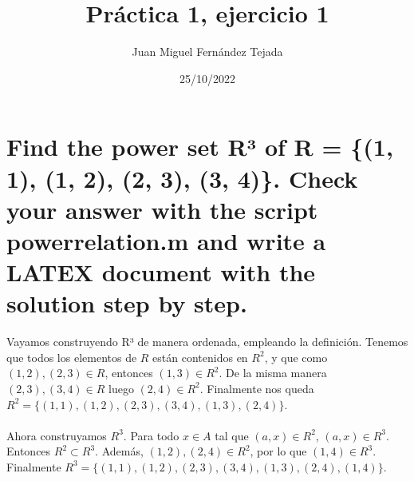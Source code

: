 \documentclass[11pt]{article}
\title{\textbf{Práctica 1, ejercicio 1}}
\author{Juan Miguel Fernández Tejada}
\date{25/10/2022}
\begin{document}
\maketitle
\thispagestyle{empty}

\section{Find the power set R³ of R = \{(1, 1), (1, 2), (2, 3), (3, 4)\}. Check your answer with the script powerrelation.m and write a LATEX document with the
solution step by step.}
Vayamos construyendo R³ de manera ordenada, empleando la definición. Tenemos que todos los elementos de $R$ están contenidos en $R^2$, y que como $(1, 2), (2, 3) \in R$, entonces $(1, 3) \in R^2$. De la misma manera $(2, 3), (3, 4) \in R$ luego $(2, 4) \in R^2$. Finalmente nos queda
${R^2 = \{(1, 1), (1, 2), (2, 3), (3, 4), (1, 3), (2, 4)\}}$.\\\\
Ahora construyamos $R^3$. Para todo $x \in A$ tal que $(a , x) \in R^2$, $(a, x) \in R^3$. Entonces $R^2 \subset R^3$. Además, $(1, 2), (2, 4) \in R^2$, por lo que $(1, 4) \in R^3$. Finalmente
${R^3 = \{(1, 1), (1, 2), (2, 3), (3, 4), (1, 3), (2, 4), (1, 4)\}}$.
\end{document}
